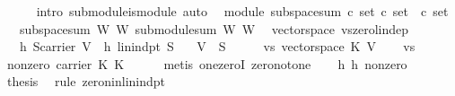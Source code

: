 \begin{isabellebody}
\ \ \ \ \isamarkupfalse%
\ {\isacharparenleft}intro\ submodule{\isacharunderscore}is{\isacharunderscore}module{\isacharcomma}\ auto{\isacharparenright}\isanewline
{}\isamarkupfalse%
%
\endisatagproof
{\isafoldproof}%
%
\isadelimproof
\isanewline
%
\endisadelimproof
\isanewline
{}\isamarkupfalse%
\ {\isacharparenleft}\ module{\isacharparenright}\ subspace{\isacharunderscore}sum{\isacharcolon}{\isacharcolon}\ {\isachardoublequoteopen}{\isacharbrackleft}{\isacharprime}c\ set{\isacharcomma}\ {\isacharprime}c\ set{\isacharbrackright}\ {\isasymRightarrow}\ {\isacharprime}c\ set{\isachardoublequoteclose}\isanewline
\ \ \ {\isachardoublequoteopen}subspace{\isacharunderscore}sum\ W{}\ W{}\ {\isasymequiv}submodule{\isacharunderscore}sum\ W{}\ W{}{\isachardoublequoteclose}\isanewline
\isanewline
{}\isamarkupfalse%
\ {\isacharparenleft}\ vectorspace{\isacharparenright}\ vs{\isacharunderscore}zero{\isacharunderscore}lin{\isacharunderscore}dep{\isacharcolon}\ \isanewline
\ \ \ h{}{\isacharcolon}\ {\isachardoublequoteopen}S{\isasymsubseteq}carrier\ V{\isachardoublequoteclose}\ \ h{}{\isacharcolon}\ {\isachardoublequoteopen}lin{\isacharunderscore}indpt\ S{\isachardoublequoteclose}\isanewline
\ \ \ {\isachardoublequoteopen}{\isasymzero}\isactrlbsub V\isactrlesub \ {\isasymnotin}\ S{\isachardoublequoteclose}\isanewline
%
\isadelimproof
%
\endisadelimproof
%
\isatagproof
{}\isamarkupfalse%
\ {\isacharminus}\isanewline
\ \ \isamarkupfalse%
\ vs{\isacharcolon}\ {\isachardoublequoteopen}vectorspace\ K\ V{\isachardoublequoteclose}\isacommand{{\isachardot}{\isachardot}}\isamarkupfalse%
\isanewline
\ \ \isamarkupfalse%
\ vs\ \isamarkupfalse%
\ nonzero{\isacharcolon}\ {\isachardoublequoteopen}carrier\ K\ {\isasymnoteq}{\isacharbraceleft}{\isasymzero}\isactrlbsub K\isactrlesub {\isacharbraceright}{\isachardoublequoteclose}\isanewline
\ \ \ \ \isamarkupfalse%
\ {\isacharparenleft}metis\ one{\isacharunderscore}zeroI\ zero{\isacharunderscore}not{\isacharunderscore}one{\isacharparenright}\isanewline
\ \ \isamarkupfalse%
\ h{}\ h{}\ nonzero\ \isamarkupfalse%
\ {\isacharquery}thesis\ \isamarkupfalse%
\ {\isacharparenleft}rule\ zero{\isacharunderscore}nin{\isacharunderscore}lin{\isacharunderscore}indpt{\isacharparenright}\isanewline

\end{isabellebody}
